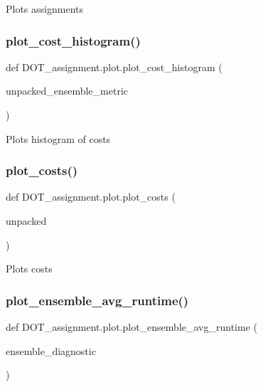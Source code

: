 \begin{DoxyVerb}Plots assignments
\end{DoxyVerb}
 \mbox{\label{namespace_d_o_t__assignment_1_1plot_afb683832b4ea2820d609be73b21eb67f}} 
\subsubsection{\texorpdfstring{plot\_cost\_histogram()}{plot\_cost\_histogram()}}
{\footnotesize\ttfamily def D\+O\+T\+\_\+assignment.\+plot.\+plot\+\_\+cost\+\_\+histogram (\begin{DoxyParamCaption}\item[{}]{unpacked\+\_\+ensemble\+\_\+metric }\end{DoxyParamCaption})}

\begin{DoxyVerb}Plots histogram of costs
\end{DoxyVerb}
 \mbox{\label{namespace_d_o_t__assignment_1_1plot_a34b200ef06cd2da33cd0b0a7f704326a}} 
\subsubsection{\texorpdfstring{plot\_costs()}{plot\_costs()}}
{\footnotesize\ttfamily def D\+O\+T\+\_\+assignment.\+plot.\+plot\+\_\+costs (\begin{DoxyParamCaption}\item[{}]{unpacked }\end{DoxyParamCaption})}

\begin{DoxyVerb}Plots costs
\end{DoxyVerb}
 \mbox{\label{namespace_d_o_t__assignment_1_1plot_a445286ce718da0ac59c11bcc6de51311}} 
\subsubsection{\texorpdfstring{plot\_ensemble\_avg\_runtime()}{plot\_ensemble\_avg\_runtime()}}
{\footnotesize\ttfamily def D\+O\+T\+\_\+assignment.\+plot.\+plot\+\_\+ensemble\+\_\+avg\+\_\+runtime (\begin{DoxyParamCaption}\item[{}]{ensemble\+\_\+diagnostic }\end{DoxyParamCaption})}

